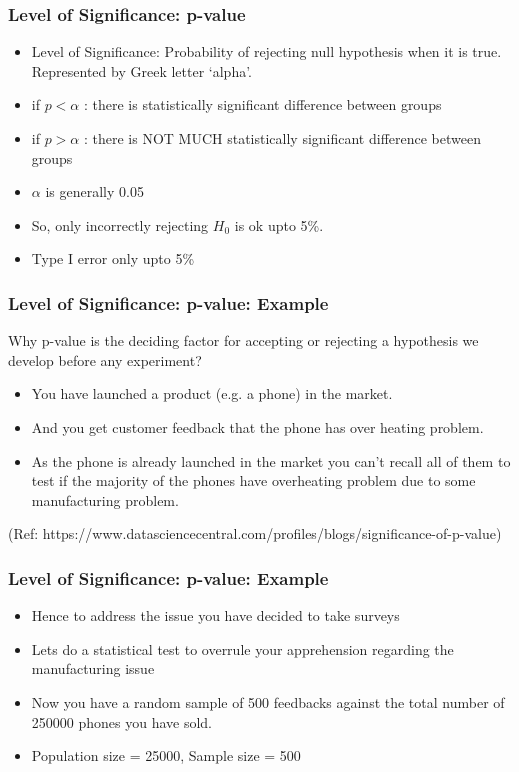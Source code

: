 \begin{frame}[fragile]\frametitle{Level of Significance: p-value}
\begin{itemize}
\item Level of Significance: Probability of rejecting null  
hypothesis when it is true. Represented by Greek letter `alpha'. 
\item if $p < \alpha$ : there is statistically significant difference between groups
\item if $p > \alpha$ : there is NOT MUCH statistically significant difference between groups
\item $\alpha$ is generally 0.05
\item So, only incorrectly rejecting $H_0$ is ok upto 5\%. 
\item Type I error only upto 5\%
\end{itemize}
\end{frame}

\begin{frame}[fragile]\frametitle{Level of Significance: p-value: Example}
 Why p-value is the deciding factor for accepting or rejecting a hypothesis we
develop before any experiment?
\begin{itemize}
\item You have launched a product (e.g. a phone) in the market. 
\item And you get customer feedback that the phone has over heating problem. 
\item As the phone is already launched in the market you can't recall all of them to test if the majority of the phones have overheating problem due to some manufacturing problem.
\end{itemize}

(Ref: https://www.datasciencecentral.com/profiles/blogs/significance-of-p-value)
\end{frame}


\begin{frame}[fragile]\frametitle{Level of Significance: p-value: Example}

\begin{itemize}
\item Hence to address the issue you have decided to take surveys
\item Lets do a statistical test to overrule your apprehension regarding the manufacturing issue
\item Now you have a random sample of 500 feedbacks against the total number of 250000 phones you have sold.
\item Population size = 25000, Sample size = 500
\end{itemize}


\end{frame}

